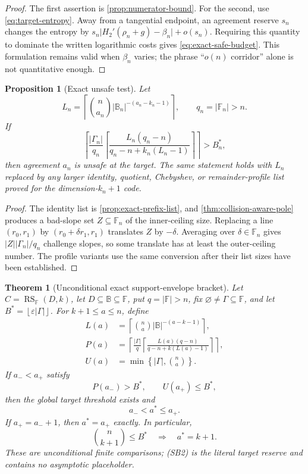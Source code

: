 \documentclass[12pt,a4paper]{amsart}
\numberwithin{equation}{section}
\newtheorem{theorem}{Theorem}[section]
\newtheorem{proposition}[proposition]{Proposition}
\theoremstyle{remark}
\DeclareMathOperator{\RS}{RS}
\newcommand{\F}{\mathbb F}
\newcommand{\B}{\mathbb B}
\newcommand{\eps}{\varepsilon}
\newcommand{\abs}[1]{\lvert #1\rvert}
\newcommand{\floor}[1]{\left\lfloor #1\right\rfloor}
\newcommand{\ceil}[1]{\left\lceil #1\right\rceil}
\begin{document}
\begin{proof}
The first assertion is \cref{prop:numerator-bound}.  For the second, use
\eqref{eq:target-entropy}.  Away from a tangential endpoint, an agreement
reserve \(s_n\) changes the entropy by
\(s_n\abs{H_2'(\rho_n+g)-\beta_n}+o(s_n)\).  Requiring this quantity to
dominate the written logarithmic costs gives \eqref{eq:exact-safe-budget}.
This formulation remains valid when \(\beta_n\) varies; the phrase
``\(o(n)\) corridor'' alone is not quantitative enough.
\end{proof}

\begin{proposition}[Exact unsafe test]\label{prop:simple-pole-lower}
Let
\[
 L_n=\left\lceil
 \binom n{a_n}\abs{\B_n}^{-(a_n-k_n-1)}
 \right\rceil,
 \qquad q_n=\abs{\F_n}>n.
\]
If
\[
 \left\lceil \frac{\abs{\Gamma_n}}{q_n}
 \left\lceil
 \frac{L_n(q_n-n)}{q_n-n+k_n(L_n-1)}
 \right\rceil\right\rceil>B_n^*,
 \tag{13.3}\label{eq:exact-unsafe-budget}
\]
then agreement \(a_n\) is unsafe at the target.  The same statement holds
with \(L_n\) replaced by any larger identity, quotient, Chebyshev, or
remainder-profile list proved for the dimension-\(k_n+1\) code.
\end{proposition}

\begin{proof}
The identity list is \cref{prop:exact-prefix-list}, and
\cref{thm:collision-aware-pole} produces a bad-slope set \(Z\subseteq\F_n\)
of the inner-ceiling size.  Replacing a line \((r_0,r_1)\) by
\((r_0+\delta r_1,r_1)\) translates \(Z\) by \(-\delta\).  Averaging over
\(\delta\in\F_n\) gives \(\abs Z\abs{\Gamma_n}/q_n\) challenge slopes, so
some translate has at least the outer-ceiling number.  The profile variants
use the same conversion after their list sizes have been established.
\end{proof}

\begin{theorem}[Unconditional exact support-envelope bracket]
\label{thm:unconditional-support-envelope-bracket}
Let \(C=\RS_\F(D,k)\), let \(D\subseteq\B\subseteq\F\), put
\(q=\abs\F>n\), fix \(\varnothing\ne\Gamma\subseteq\F\), and let
\(B^*=\floor{\eps\abs\Gamma}\).  For \(k+1\le a\le n\), define
\[
 \begin{split}
 L(a)&=\ceil{\binom na\abs\B^{-(a-k-1)}},\\
 P(a)&=\left\lceil\frac{\abs\Gamma}{q}
       \left\lceil\frac{L(a)(q-n)}
       {q-n+k(L(a)-1)}\right\rceil\right\rceil,\\
 U(a)&=\min\left\{\abs\Gamma,\binom na\right\}.
 \end{split}                                       \tag{SB1}
\]
If \(a_-<a_+\) satisfy
\[
                         P(a_-)>B^*,\qquad U(a_+)\le B^*, \tag{SB2}
\]
then the global target threshold exists and
\[
                         a_-<a^*\le a_+.            \tag{SB3}
\]
If \(a_+=a_-+1\), then \(a^*=a_+\) exactly.  In particular,
\[
                  \binom n{k+1}\le B^*\quad\Longrightarrow\quad
                  a^*=k+1.                         \tag{SB4}
\]
These are unconditional finite comparisons; \textup{(SB2)} is the
literal target reserve and contains no asymptotic placeholder.
\end{theorem}
\end{document}
